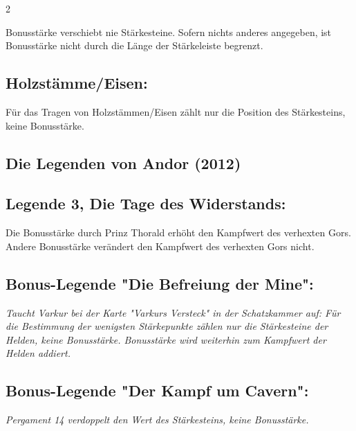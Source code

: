 \documentclass[10pt, a4paper, oneside]{book}
\newcommand{\fan}[1]{\textit{#1}}
\begin{document}
\begin{multicols*}{2}
\begin{nobgcolor}
Bonusstärke verschiebt nie Stärkesteine. Sofern nichts anderes angegeben, ist Bonusstärke nicht durch die Länge der Stärkeleiste begrenzt.



\subsection{Holzstämme/Eisen:}

Für das Tragen von Holzstämmen/Eisen zählt nur die Position des Stärkesteins, keine Bonusstärke.
\supercite{DRidN:Begleitheft,DlH:Begleitheft,AG:Begleitheft,DfL:Begleitheft}


\end{nobgcolor}



\begin{bgcolor}
\section{Die Legenden von Andor (2012)}


\subsection{Legende 3, Die Tage des Widerstands:}

Die Bonusstärke durch Prinz Thorald erhöht den Kampfwert des verhexten Gors. 
\supercite{DLvA3:Der_verhexte_Gor}
Andere Bonusstärke verändert den Kampfwert des verhexten Gors nicht.
\supercite{155,3450}


\subsection{Bonus-Legende "Die Befreiung der Mine":}

\fan{Taucht Varkur bei der Karte "Varkurs Versteck" in der Schatzkammer auf: Für die Bestimmung der wenigsten Stärkepunkte zählen nur die Stärkesteine der Helden, keine Bonusstärke. Bonusstärke wird weiterhin zum Kampfwert der Helden addiert.}


\subsection{Bonus-Legende "Der Kampf um Cavern":}

\fan{Pergament 14 verdoppelt den Wert des Stärkesteins, keine Bonusstärke.}

\end{bgcolor}




\end{multicols*}
\end{document}
